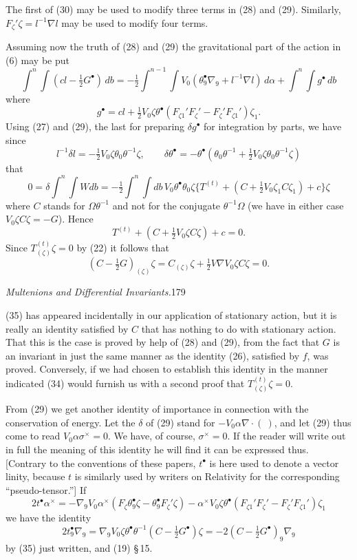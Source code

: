 \documentclass[11pt]{article}
\begin{document}
\indent The first of (30) may be used to modify three terms in (28) and (29). Similarly, $F_\zeta'\zeta=l^{-1}\nabla l$ may be used to modify four terms.

\indent Assuming now the truth of (28) and (29) the gravitational part of the action in (6) may be put
\[
  \int^n\!\int(cl-\tfrac12G^\bullet)\,db=-\tfrac12\int^{n-1}\!\int V_0(\theta^\bullet_9\nabla_9+l^{-1}\nabla l)\,d\alpha+\int^n\!\int g^\bullet\,db
  \tag{31}
\]
where
\[
  g^\bullet=cl+\tfrac12V_0\zeta\theta^\bullet(F_{\zeta1}'F_\zeta'-F_\zeta'F_{\zeta1}')\zeta_1.
  \tag{32}
\]
Using (27) and (29), the last for preparing $\delta g^\bullet$ for integration by parts, we have since
\[
  l^{-1}\delta l=-\tfrac12V_0\zeta\theta_0\theta^{-1}\zeta,\qquad
  \delta\theta^\bullet=-\theta^\bullet(\theta_0\theta^{-1}+\tfrac12V_0\zeta\theta_0\theta^{-1}\zeta)
  \tag{33}
\]
that
\[
  0=\delta\int^n\!\int Wdb=-\tfrac12\int^n\!\int db\,V_0\theta^\bullet\theta_0\zeta\{T^{(t)}+(C+\tfrac12V_0\zeta_1C\zeta_1)+c\}\zeta
\]
where $C$ stands for $\Omega\theta^{-1}$ and not for the conjugate $\theta^{-1}\Omega$ (we have in either case $V_0\zeta C\zeta=-G$). Hence
\[
  T^{(t)}+(C+\tfrac12V_0\zeta C\zeta)+c=0.
  \tag{34}
\]
Since $T_{(\zeta)}^{(t)}\zeta=0$ by (22) it follows that
\[
  (C-\tfrac12G)_{(\zeta)}\zeta=C_{(\zeta)}\zeta+\tfrac12V\nabla V_0\zeta C\zeta=0.
  \tag{35}
\]

\newpage\thispagestyle{empty}\begin{center}\textit{Multenions and Differential Invariants.}\hfill 179\end{center}
\indent (35) has appeared incidentally in our application of stationary action, but it is really an identity satisfied by $C$ that has nothing to do with stationary action. That this is the case is proved by help of (28) and (29), from the fact that $G$ is an invariant in just the same manner as the identity (26), satisfied by $f$, was proved. Conversely, if we had chosen to establish this identity in the manner indicated (34) would furnish us with a second proof that $T_{(\zeta)}^{(t)}\zeta=0$.

\indent From (29) we get another identity of importance in connection with the conservation of energy. Let the $\delta$ of (29) stand for $-V_0\alpha\nabla\mathbin{\cdot}(\ )$, and let (29) thus come to read $V_0\alpha\sigma^\times=0$. We have, of course, $\sigma^\times=0$. If the reader will write out in full the meaning of this identity he will find it can be expressed thus. [Contrary to the conventions of these papers, $t^\bullet$ is here used to denote a vector linity, because $t$ is similarly used by writers on Relativity for the corresponding ``pseudo-tensor.''] If
\[
  2t^\bullet\alpha^\times=-\nabla_9V_0\alpha^\times(F_\zeta\theta^\bullet_9\zeta-\theta^\bullet_9F_\zeta'\zeta)-\alpha^\times V_0\zeta\theta^\bullet(F_{\zeta1}'F_\zeta'-F_\zeta'F_{\zeta1}')\zeta_1
  \tag{36}
\]
we have the identity
\[
  2t^\bullet_9\nabla_9=\nabla_9V_0\zeta\theta^\bullet\theta^{-1}(C-\tfrac12G^\bullet)\zeta=-2(C-\tfrac12G^\bullet)_9\nabla_9
  \tag{37}
\]
by (35) just written, and (19) \S\,15.
\end{document}
